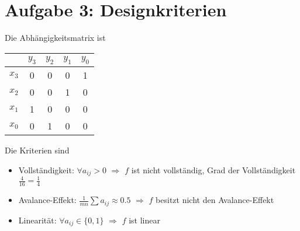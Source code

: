 \documentclass{article}
\begin{document}
	\section*{Aufgabe 3: Designkriterien}
	Die Abhängigkeitsmatrix ist
	\begin{center}
		\begin{tabular}{c|cccc}
			 & $y_3$ & $y_2$ & $y_1$ & $y_0$ \\
			 \hline
			 $x_3$ & 0 & 0 & 0 & 1 \\
			 $x_2$ & 0 & 0 & 1 & 0 \\
			 $x_1$ & 1 & 0 & 0 & 0 \\
			 $x_0$ & 0 & 1 & 0 & 0 \\
		\end{tabular}
	\end{center}
	Die Kriterien sind
	\begin{itemize}
		\item Vollständigkeit: $\forall a_{ij} >0$ $\Rightarrow$ $f$ ist nicht vollständig, Grad der Vollständigkeit $\frac{4}{16} = \frac{1}{4}$
		\item Avalance-Effekt: $\frac{1}{mn}\sum a_{ij} \approx 0.5$ $\Rightarrow$ $f$ besitzt nicht den Avalance-Effekt
		\item Linearität: $\forall a_{ij}\in \{0,1\}$ $\Rightarrow$ $f$ ist linear
	\end{itemize}
\end{document}
